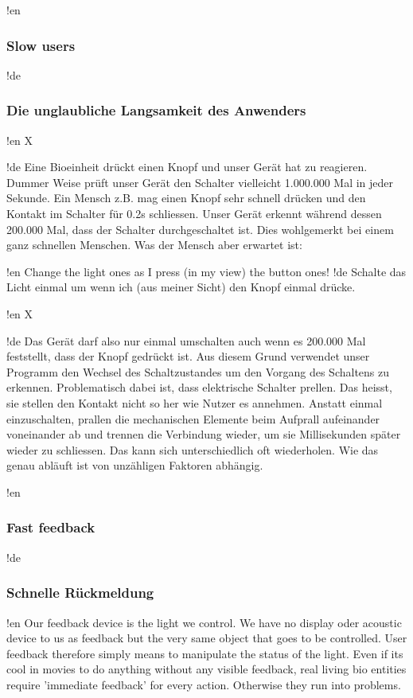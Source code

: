 !en \subsubsection{Slow users}
!de \subsubsection{Die unglaubliche Langsamkeit des Anwenders}



!en X

!de Eine Bioeinheit drückt einen Knopf und unser Gerät hat zu reagieren. Dummer Weise prüft unser Gerät den Schalter vielleicht 1.000.000 Mal in jeder Sekunde. Ein Mensch z.B. mag einen Knopf sehr schnell drücken und den Kontakt im Schalter für 0.2s schliessen. Unser Gerät erkennt während dessen 200.000 Mal, dass der Schalter durchgeschaltet ist. Dies wohlgemerkt bei einem ganz schnellen Menschen. Was der Mensch aber erwartet ist:

\begin{center}
!en Change the light ones as I press (in my view) the button ones!
!de Schalte das Licht einmal um wenn ich (aus meiner Sicht) den Knopf einmal drücke. 
\end{center}



!en X

!de Das Gerät darf also nur einmal umschalten auch wenn es 200.000 Mal feststellt, dass der Knopf gedrückt ist. Aus diesem Grund verwendet unser Programm den Wechsel des Schaltzustandes um den Vorgang des Schaltens zu erkennen. Problematisch dabei ist, dass elektrische Schalter prellen. Das heisst, sie stellen den Kontakt nicht so her wie Nutzer es annehmen. Anstatt einmal einzuschalten, prallen die mechanischen Elemente beim Aufprall aufeinander voneinander ab und trennen die Verbindung wieder, um sie Millisekunden später wieder zu schliessen. Das kann sich unterschiedlich oft wiederholen. Wie das genau abläuft ist von unzähligen Faktoren abhängig. 



!en \subsubsection{Fast feedback}
!de \subsubsection{Schnelle Rückmeldung}

!en Our feedback device is the light we control. We have no display oder acoustic device to us as feedback but the very same object that goes to be controlled. User feedback therefore simply means to manipulate the status of the light. Even if its cool in movies to do anything without any visible feedback, real living bio entities require 'immediate feedback' for every action. Otherwise they run into problems.

